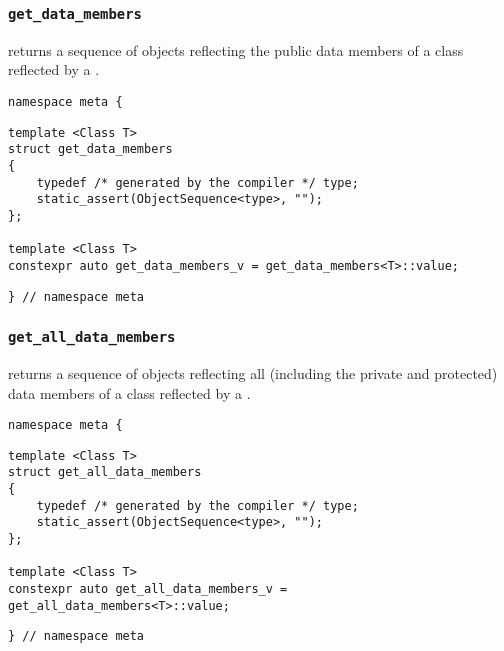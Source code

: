 
\subsubsection{\texttt{get\_data\_members}}

returns a sequence of objects reflecting the public data members of a class reflected by a .

\begin{verbatim}
namespace meta {
\end{verbatim}
\begin{verbatim}
template <Class T>
struct get_data_members
{
	typedef /* generated by the compiler */ type;
	static_assert(ObjectSequence<type>, "");
};
	
template <Class T>
constexpr auto get_data_members_v = get_data_members<T>::value;
\end{verbatim}
\begin{verbatim}
} // namespace meta
\end{verbatim}

\subsubsection{\texttt{get\_all\_data\_members}}

returns a sequence of objects reflecting all    (including the private and protected)   data members of a class reflected by a .

\begin{verbatim}
namespace meta {
\end{verbatim}
\begin{verbatim}
template <Class T>
struct get_all_data_members
{
	typedef /* generated by the compiler */ type;
	static_assert(ObjectSequence<type>, "");
};
	
template <Class T>
constexpr auto get_all_data_members_v = get_all_data_members<T>::value;
\end{verbatim}
\begin{verbatim}
} // namespace meta
\end{verbatim}
